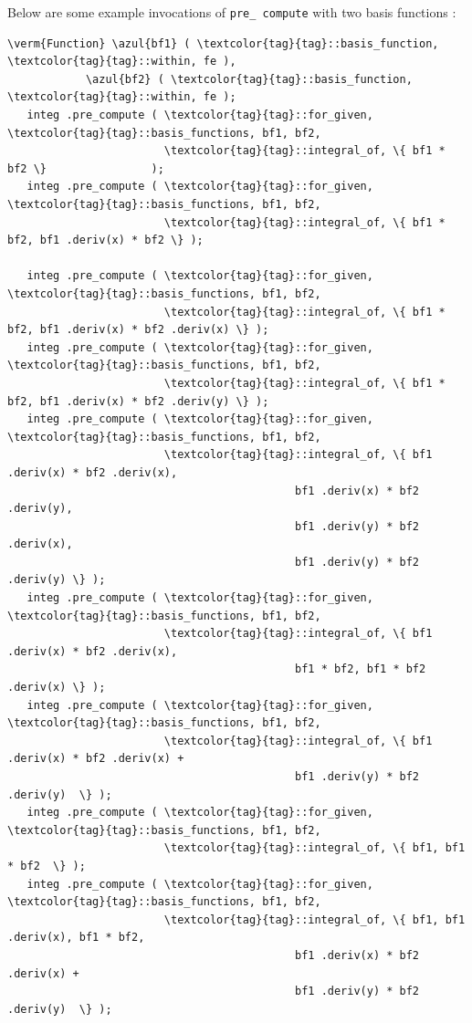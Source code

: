 Below are some example invocations of {\small\tt pre\_\,compute} with two basis functions :
\begin{Verbatim}[commandchars=\\\{\},formatcom=\small\tt,
   baselinestretch=0.94,framesep=2mm                      ]
   \verm{Function} \azul{bf1} ( \textcolor{tag}{tag}::basis_function, \textcolor{tag}{tag}::within, fe ),
            \azul{bf2} ( \textcolor{tag}{tag}::basis_function, \textcolor{tag}{tag}::within, fe );
   integ .pre_compute ( \textcolor{tag}{tag}::for_given, \textcolor{tag}{tag}::basis_functions, bf1, bf2,
                        \textcolor{tag}{tag}::integral_of, \{ bf1 * bf2 \}                );
   integ .pre_compute ( \textcolor{tag}{tag}::for_given, \textcolor{tag}{tag}::basis_functions, bf1, bf2,
                        \textcolor{tag}{tag}::integral_of, \{ bf1 * bf2, bf1 .deriv(x) * bf2 \} );

   integ .pre_compute ( \textcolor{tag}{tag}::for_given, \textcolor{tag}{tag}::basis_functions, bf1, bf2,
                        \textcolor{tag}{tag}::integral_of, \{ bf1 * bf2, bf1 .deriv(x) * bf2 .deriv(x) \} );
   integ .pre_compute ( \textcolor{tag}{tag}::for_given, \textcolor{tag}{tag}::basis_functions, bf1, bf2,
                        \textcolor{tag}{tag}::integral_of, \{ bf1 * bf2, bf1 .deriv(x) * bf2 .deriv(y) \} );
   integ .pre_compute ( \textcolor{tag}{tag}::for_given, \textcolor{tag}{tag}::basis_functions, bf1, bf2,
                        \textcolor{tag}{tag}::integral_of, \{ bf1 .deriv(x) * bf2 .deriv(x),
                                            bf1 .deriv(x) * bf2 .deriv(y),
                                            bf1 .deriv(y) * bf2 .deriv(x),
                                            bf1 .deriv(y) * bf2 .deriv(y) \} );
   integ .pre_compute ( \textcolor{tag}{tag}::for_given, \textcolor{tag}{tag}::basis_functions, bf1, bf2,
                        \textcolor{tag}{tag}::integral_of, \{ bf1 .deriv(x) * bf2 .deriv(x),
                                            bf1 * bf2, bf1 * bf2 .deriv(x) \} );
   integ .pre_compute ( \textcolor{tag}{tag}::for_given, \textcolor{tag}{tag}::basis_functions, bf1, bf2,
                        \textcolor{tag}{tag}::integral_of, \{ bf1 .deriv(x) * bf2 .deriv(x) +
                                            bf1 .deriv(y) * bf2 .deriv(y)  \} );
   integ .pre_compute ( \textcolor{tag}{tag}::for_given, \textcolor{tag}{tag}::basis_functions, bf1, bf2,
                        \textcolor{tag}{tag}::integral_of, \{ bf1, bf1 * bf2  \} );
   integ .pre_compute ( \textcolor{tag}{tag}::for_given, \textcolor{tag}{tag}::basis_functions, bf1, bf2,
                        \textcolor{tag}{tag}::integral_of, \{ bf1, bf1 .deriv(x), bf1 * bf2,
                                            bf1 .deriv(x) * bf2 .deriv(x) +
                                            bf1 .deriv(y) * bf2 .deriv(y)  \} );
\end{Verbatim}

